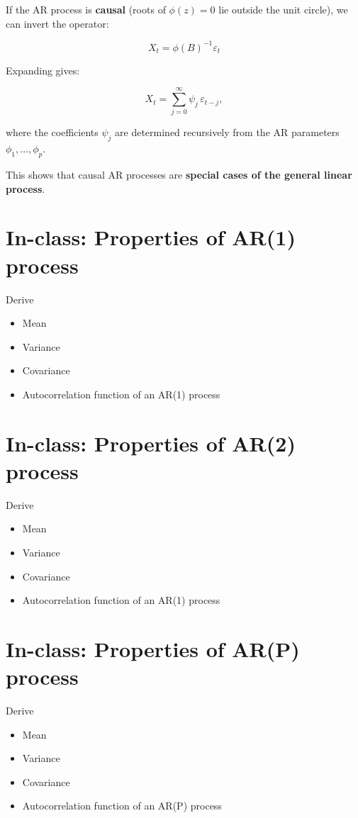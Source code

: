 \documentclass[
  11pt,
  a4paper,
]{report}
\begin{document}
If the AR process is \textbf{causal} (roots of \(\phi(z)=0\) lie outside
the unit circle), we can invert the operator:

\[X_t = \phi(B)^{-1} \varepsilon_t\]

Expanding gives:

\[X_t = \sum_{j=0}^{\infty} \psi_j \, \varepsilon_{t-j},\]

where the coefficients \(\psi_j\) are determined recursively from the AR
parameters \(\phi_1, \dots, \phi_p\).

This shows that causal AR processes are \textbf{special cases of the
general linear process}.

\section{In-class: Properties of AR(1)
process}\label{in-class-properties-of-ar1-process}

Derive

\begin{itemize}
\item
  Mean
\item
  Variance
\item
  Covariance
\item
  Autocorrelation function of an AR(1) process
\end{itemize}

\section{In-class: Properties of AR(2)
process}\label{in-class-properties-of-ar2-process}

Derive

\begin{itemize}
\item
  Mean
\item
  Variance
\item
  Covariance
\item
  Autocorrelation function of an AR(1) process
\end{itemize}

\section{In-class: Properties of AR(P)
process}\label{in-class-properties-of-arp-process}

Derive

\begin{itemize}
\item
  Mean
\item
  Variance
\item
  Covariance
\item
  Autocorrelation function of an AR(P) process
\end{itemize}
\end{document}
